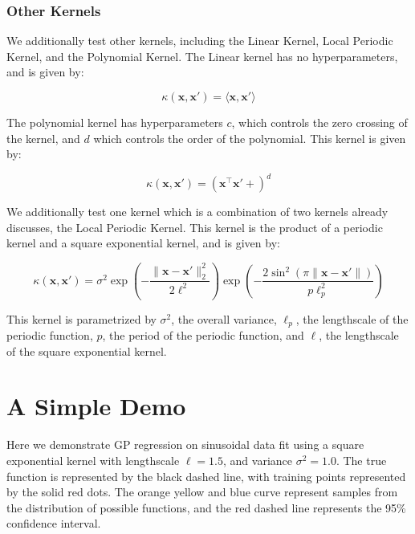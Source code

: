 \documentclass{article}
\newcommand{\bx}{\boldsymbol{x}}
\begin{document}
\subsubsection{Other Kernels}

We additionally test other kernels, including the Linear Kernel, Local Periodic Kernel, and the Polynomial Kernel. The
Linear kernel has no hyperparameters, and is given by:

\[
  \kappa(\bx, \bx') = \langle \bx, \bx' \rangle
\]

The polynomial kernel has hyperparameters $c$, which controls the zero crossing of the kernel, and $d$ which controls the
order of the polynomial. This kernel is given by:

\[
  \kappa(\bx, \bx') = (\bx^{\top}\bx' + )^{d}
\]

We additionally test one kernel which is a combination of two kernels already discusses, the Local Periodic Kernel.
This kernel is the product of a periodic kernel and a square exponential kernel, and is given by:

\[
  \kappa(\bx, \bx') = \sigma^2 \exp\left( - \frac{\|\bx -\bx' \|_{2}^{2}}{2 \ell^2} \right)  \exp(-
  \frac{2 \sin^{2}(\pi \|\bx - \bx'\|)}{p \ell_{p}^{2}})
\]

This kernel is parametrized by $\sigma^{2}$, the overall variance, $\ell_p$, the lengthscale of the periodic function,
$p$, the period of the periodic function, and $\ell$, the lengthscale of the square exponential kernel.


\section{A Simple Demo}
Here we demonstrate GP regression on sinusoidal data fit using a square exponential kernel with lengthscale $\ell =
1.5$, and variance $\sigma^{2} = 1.0$. The true function is represented by the black dashed line, with training points
represented by the solid red dots. The orange yellow and blue curve represent samples from the distribution of possible
functions, and the red dashed line represents the 95\% confidence interval.
\end{document}
